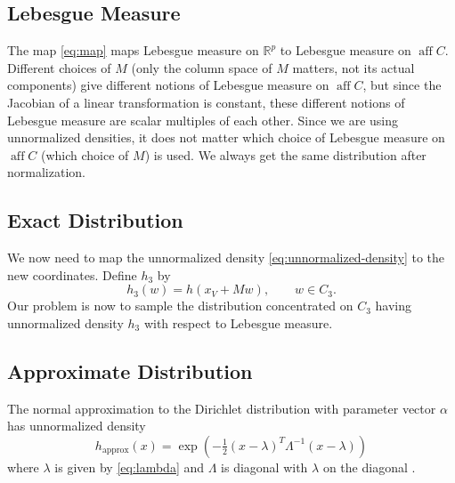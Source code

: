 \documentclass[11pt]{article}
\DeclareMathOperator{\aff}{aff}
\newcommand{\real}{\mathbb{R}}
\begin{document}
\subsection{Lebesgue Measure} \label{sec:lebesgue}

The map \eqref{eq:map} maps Lebesgue measure on $\real^p$ to Lebesgue measure
on $\aff C$.  Different choices of $M$ (only the column space of $M$ matters,
not its actual components) give different notions of Lebesgue measure on
$\aff C$, but since the Jacobian of a linear transformation is constant,
these different notions of Lebesgue measure are scalar multiples of each other.
Since we are using unnormalized densities, it does not matter which choice
of Lebesgue measure on $\aff C$ (which choice of $M$) is used.
We always get the same distribution after normalization.

\subsection{Exact Distribution}

We now need to map the unnormalized density \eqref{eq:unnormalized-density}
to the new coordinates.  Define $h_3$ by
\begin{equation} \label{eq:h-new}
   h_3(w) = h(x_V + M w), \qquad w \in C_3.
\end{equation}
Our problem is now to sample the distribution concentrated on $C_3$
having unnormalized density $h_3$ with respect to Lebesgue measure.

\subsection{Approximate Distribution} \label{sec:approximate}

The normal approximation to the Dirichlet distribution with
parameter vector $\alpha$ has unnormalized density
$$
   h_{\text{approx}}(x)
   =
   \exp\left(- \tfrac{1}{2} (x - \lambda)^T \Lambda^{- 1} (x - \lambda) \right)
$$
where $\lambda$ is given by \eqref{eq:lambda} and $\Lambda$ is diagonal
with $\lambda$ on the diagonal \citep[Theorem~4.2]{geyer-meeden}.
\end{document}
